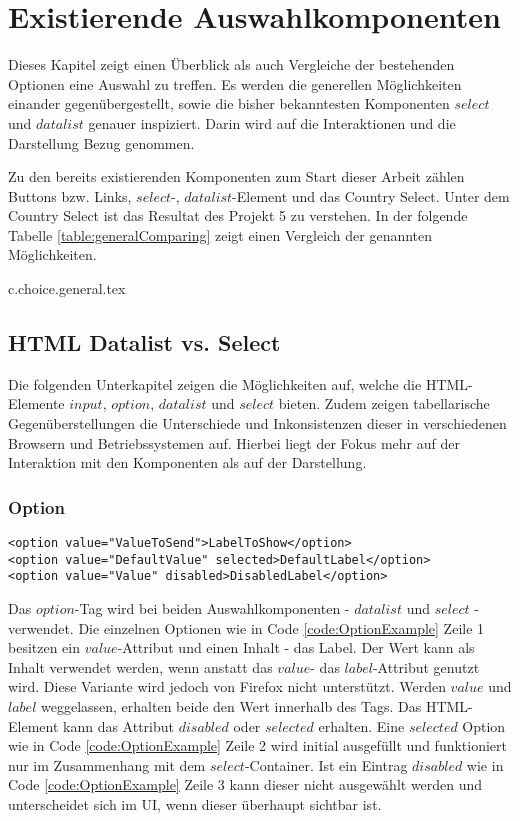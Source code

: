 \chapter{Existierende Auswahlkomponenten}

Dieses Kapitel zeigt einen Überblick als auch Vergleiche der bestehenden Optionen eine Auswahl zu treffen. 
Es werden die generellen Möglichkeiten einander gegenübergestellt, sowie die bisher bekanntesten Komponenten $select$ und $datalist$ genauer inspiziert.
Darin wird auf die Interaktionen und die Darstellung Bezug genommen. 

Zu den bereits existierenden Komponenten zum Start dieser Arbeit zählen Buttons bzw. Links, $select$-, $datalist$-Element und das Country Select.
Unter dem Country Select ist das Resultat des Projekt 5 zu verstehen.
In der folgende Tabelle \ref{table:generalComparing} zeigt einen Vergleich der genannten Möglichkeiten.

{c.choice.general.tex}

\section{HTML Datalist vs. Select}

Die folgenden Unterkapitel zeigen die Möglichkeiten auf, welche die HTML-Elemente $input$, $option$, $datalist$ und $select$ bieten.
Zudem zeigen tabellarische Gegenüberstellungen die Unterschiede und Inkonsistenzen dieser in verschiedenen Browsern und Betriebssystemen auf.
Hierbei liegt der Fokus mehr auf der Interaktion mit den Komponenten als auf der Darstellung.


\subsection{Option}

\begin{lstlisting}[style = htmlcssjs, caption = Option Example, label = code:OptionExample]
<option value="ValueToSend">LabelToShow</option>
<option value="DefaultValue" selected>DefaultLabel</option>
<option value="Value" disabled>DisabledLabel</option>
\end{lstlisting}

Das $option$-Tag wird bei beiden Auswahlkomponenten - $datalist$ und $select$ - verwendet. 
Die einzelnen Optionen wie in Code \ref{code:OptionExample} Zeile 1 besitzen ein $value$-Attribut und einen Inhalt - das Label.
Der Wert kann als Inhalt verwendet werden, wenn anstatt das $value$- das $label$-Attribut genutzt wird.
Diese Variante wird jedoch von Firefox nicht unterstützt.
Werden $value$ und $label$ weggelassen, erhalten beide den Wert innerhalb des Tags.
Das HTML-Element kann das Attribut $disabled$ oder $selected$ erhalten.
Eine $selected$ Option wie in Code \ref{code:OptionExample} Zeile 2 wird initial ausgefüllt und funktioniert nur im Zusammenhang mit dem $select$-Container. 
Ist ein Eintrag $disabled$ wie in Code \ref{code:OptionExample} Zeile 3 kann dieser nicht ausgewählt werden und unterscheidet sich im UI, wenn dieser überhaupt sichtbar ist.

